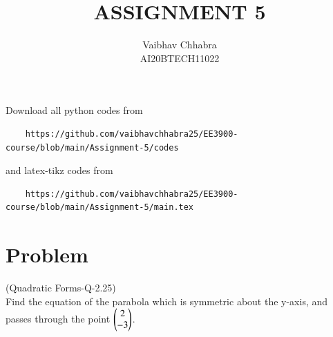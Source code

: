 \documentclass[journal,12pt,twocolumn]{IEEEtran}
\begin{document}
     \def\topbox#1{\raisebox{-\baselineskip}[0in][0in]{#1}}
     \def\midbox#1{\raisebox{-0.5\baselineskip}[0in][0in]{#1}}
\vspace{3cm}
\title{ASSIGNMENT 5}
\author{Vaibhav Chhabra\\ AI20BTECH11022}
\maketitle
\newpage
\bigskip
\renewcommand{\thefigure}{\theenumi}
\renewcommand{\thetable}{\theenumi}
Download all python codes from 
\begin{lstlisting}
    https://github.com/vaibhavchhabra25/EE3900-course/blob/main/Assignment-5/codes
\end{lstlisting}
%
and latex-tikz codes from 
%
\begin{lstlisting}
    https://github.com/vaibhavchhabra25/EE3900-course/blob/main/Assignment-5/main.tex
\end{lstlisting}
%
\section{Problem}
(Quadratic Forms-Q-2.25)\\
Find the equation of the parabola which is symmetric about the y-axis, and passes through the point $\begin{pmatrix}2\\-3\end{pmatrix}$.
\end{document}
